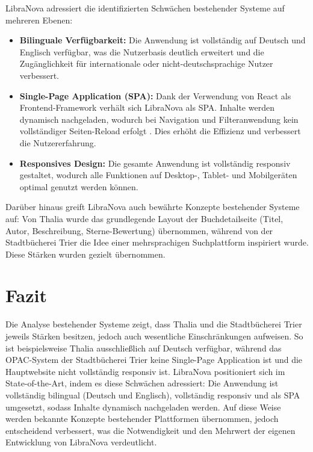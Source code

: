 LibraNova adressiert die identifizierten Schwächen bestehender Systeme auf mehreren Ebenen:  

\begin{itemize}
	\item \textbf{Bilinguale Verfügbarkeit:} Die Anwendung ist vollständig auf Deutsch und Englisch verfügbar, was die Nutzerbasis deutlich erweitert und die Zugänglichkeit für internationale oder nicht-deutschsprachige Nutzer verbessert.
	\item \textbf{Single-Page Application (SPA):} Dank der Verwendung von React als Frontend-Framework verhält sich LibraNova als SPA. Inhalte werden dynamisch nachgeladen, wodurch bei Navigation und Filteranwendung kein vollständiger Seiten-Reload  erfolgt \cite{SPRINGBOOTREACT2025}. Dies erhöht die Effizienz und verbessert die Nutzererfahrung. 
	\item \textbf{Responsives Design:} Die gesamte Anwendung ist vollständig responsiv gestaltet, wodurch alle Funktionen auf Desktop-, Tablet- und Mobilgeräten optimal genutzt werden können.
\end{itemize}

\noindent Darüber hinaus greift LibraNova auch bewährte Konzepte bestehender Systeme auf: 
Von Thalia wurde das grundlegende Layout der Buchdetailseite (Titel, Autor, Beschreibung, Sterne-Bewertung) übernommen, während von der Stadtbücherei Trier die Idee einer mehrsprachigen Suchplattform inspiriert wurde. 
Diese Stärken wurden gezielt übernommen.


\section{Fazit}

Die Analyse bestehender Systeme zeigt, dass Thalia und die Stadtbücherei Trier jeweils Stärken besitzen, jedoch auch wesentliche Einschränkungen aufweisen. So ist beispielsweise Thalia ausschließlich auf Deutsch verfügbar, während das OPAC-System der Stadtbücherei Trier keine Single-Page Application ist und die Hauptwebsite nicht vollständig responsiv ist. LibraNova positioniert sich im State-of-the-Art, indem es diese Schwächen adressiert: Die Anwendung ist vollständig bilingual (Deutsch und Englisch), vollständig responsiv und als SPA umgesetzt, sodass Inhalte dynamisch nachgeladen werden. Auf diese Weise werden bekannte Konzepte bestehender Plattformen übernommen, jedoch entscheidend verbessert, was die Notwendigkeit und den Mehrwert der eigenen Entwicklung von LibraNova verdeutlicht.
